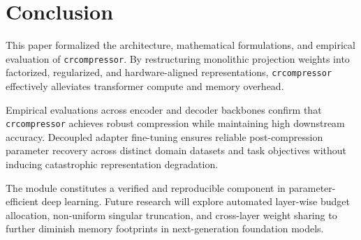 \section{Conclusion}
This paper formalized the architecture, mathematical formulations, and empirical evaluation of \texttt{crcompressor}. By restructuring monolithic projection weights into factorized, regularized, and hardware-aligned representations, \texttt{crcompressor} effectively alleviates transformer compute and memory overhead.

Empirical evaluations across encoder and decoder backbones confirm that \texttt{crcompressor} achieves robust compression while maintaining high downstream accuracy. Decoupled adapter fine-tuning ensures reliable post-compression parameter recovery across distinct domain datasets and task objectives without inducing catastrophic representation degradation.

The module constitutes a verified and reproducible component in parameter-efficient deep learning. Future research will explore automated layer-wise budget allocation, non-uniform singular truncation, and cross-layer weight sharing to further diminish memory footprints in next-generation foundation models.
